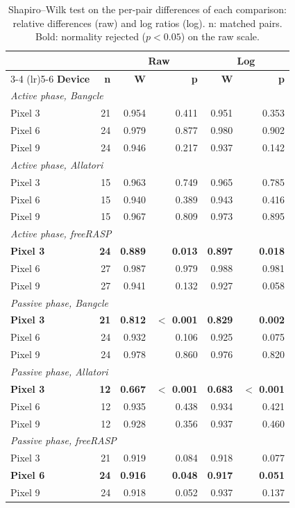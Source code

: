 \begin{table}[t]
\centering
\small
\caption{Shapiro--Wilk test on the per-pair differences of each comparison: relative differences (raw) and log ratios (log). n: matched pairs. Bold: normality rejected ($p < 0.05$) on the raw scale.}
\label{tab:normality}
\begin{tabular}{lrrrrr}
\toprule
& & \multicolumn{2}{c}{\textbf{Raw}} & \multicolumn{2}{c}{\textbf{Log}} \\
\cmidrule(lr){3-4} \cmidrule(lr){5-6}
\textbf{Device} & \textbf{n} & \textbf{W} & \textbf{p} & \textbf{W} & \textbf{p} \\
\midrule
\multicolumn{6}{l}{\textit{Active phase, Bangcle}} \\
Pixel 3 & 21 & 0.954 & 0.411 & 0.951 & 0.353 \\
Pixel 6 & 24 & 0.979 & 0.877 & 0.980 & 0.902 \\
Pixel 9 & 24 & 0.946 & 0.217 & 0.937 & 0.142 \\
\midrule
\multicolumn{6}{l}{\textit{Active phase, Allatori}} \\
Pixel 3 & 15 & 0.963 & 0.749 & 0.965 & 0.785 \\
Pixel 6 & 15 & 0.940 & 0.389 & 0.943 & 0.416 \\
Pixel 9 & 15 & 0.967 & 0.809 & 0.973 & 0.895 \\
\midrule
\multicolumn{6}{l}{\textit{Active phase, freeRASP}} \\
\textbf{Pixel 3} & \textbf{24} & \textbf{0.889} & \textbf{0.013} & \textbf{0.897} & \textbf{0.018} \\
Pixel 6 & 27 & 0.987 & 0.979 & 0.988 & 0.981 \\
Pixel 9 & 27 & 0.941 & 0.132 & 0.927 & 0.058 \\
\midrule
\multicolumn{6}{l}{\textit{Passive phase, Bangcle}} \\
\textbf{Pixel 3} & \textbf{21} & \textbf{0.812} & \textbf{$<$ 0.001} & \textbf{0.829} & \textbf{0.002} \\
Pixel 6 & 24 & 0.932 & 0.106 & 0.925 & 0.075 \\
Pixel 9 & 24 & 0.978 & 0.860 & 0.976 & 0.820 \\
\midrule
\multicolumn{6}{l}{\textit{Passive phase, Allatori}} \\
\textbf{Pixel 3} & \textbf{12} & \textbf{0.667} & \textbf{$<$ 0.001} & \textbf{0.683} & \textbf{$<$ 0.001} \\
Pixel 6 & 12 & 0.935 & 0.438 & 0.934 & 0.421 \\
Pixel 9 & 12 & 0.928 & 0.356 & 0.937 & 0.460 \\
\midrule
\multicolumn{6}{l}{\textit{Passive phase, freeRASP}} \\
Pixel 3 & 21 & 0.919 & 0.084 & 0.918 & 0.077 \\
\textbf{Pixel 6} & \textbf{24} & \textbf{0.916} & \textbf{0.048} & \textbf{0.917} & \textbf{0.051} \\
Pixel 9 & 24 & 0.918 & 0.052 & 0.937 & 0.137 \\
\bottomrule
\end{tabular}
\end{table}
